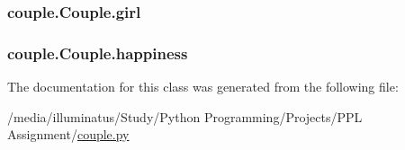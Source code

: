 \subsubsection[{\texorpdfstring{girl}{girl}}]{\setlength{\rightskip}{0pt plus 5cm}couple.\+Couple.\+girl}\hypertarget{classcouple_1_1_couple_a99b4aa0aa5cd56aab0edebbba13e31b3}{}\label{classcouple_1_1_couple_a99b4aa0aa5cd56aab0edebbba13e31b3}
\subsubsection[{\texorpdfstring{happiness}{happiness}}]{\setlength{\rightskip}{0pt plus 5cm}couple.\+Couple.\+happiness}\hypertarget{classcouple_1_1_couple_acfd8db3febb395596db4f5ab4ed53976}{}\label{classcouple_1_1_couple_acfd8db3febb395596db4f5ab4ed53976}


The documentation for this class was generated from the following file\+:\begin{DoxyCompactItemize}
\item 
/media/illuminatus/\+Study/\+Python Programming/\+Projects/\+P\+P\+L Assignment/\hyperlink{couple_8py}{couple.\+py}\end{DoxyCompactItemize}
